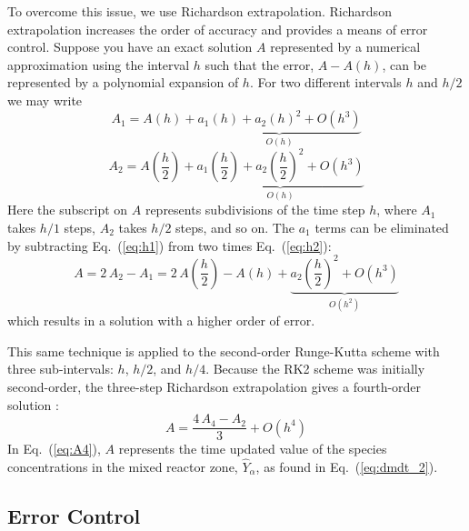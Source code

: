 To overcome this issue, we use Richardson extrapolation. Richardson extrapolation increases the order of accuracy and provides a means of error control. Suppose you have an exact solution $A$ represented by a numerical approximation using the interval $h$ such that the error, $A-A(h)$, can be represented by a polynomial expansion of $h$. For
two different intervals $h$ and $h/2$ we may write
\begin{equation}\label{eq:h1}
A_1={A(h)} + \underbrace{a_{1}(h) + a_{2}(h)^2 + \mathit{O}(h^3)}_{\mathit{O}(h)}
\end{equation}
\begin{equation}\label{eq:h2}
A_2=A\left(\frac{h}{2}\right) + \underbrace{a_{1}\left(\frac{h}{2}\right) + a_{2}\left(\frac{h}{2}\right)^2 + \mathit{O}(h^3)}_{\mathit{O}(h)}
\end{equation}
Here the subscript on $A$ represents subdivisions of the time step $h$, where $A_1$ takes $h/1$ steps, $A_2$ takes $h/2$ steps, and so on. The $a_{1}$ terms can be eliminated by subtracting Eq.~(\ref{eq:h1}) from two times Eq.~(\ref{eq:h2}):
\begin{equation}\label{eq:A2}
A=2\,A_2-A_1 = 2\,A\left(\frac{h}{2}\right) - A(h) + \underbrace{a_{2}\left(\frac{h}{2}\right)^2 + \mathit{O}(h^3)}_{\mathit{O}(h^2)}
\end{equation}
which results in a solution with a higher order of error.

This same technique is applied to the second-order Runge-Kutta scheme with three sub-intervals: $h$, $h/2$, and $h/4$. Because the RK2 scheme was initially second-order, the three-step Richardson extrapolation gives a fourth-order solution \cite{Moin:2001}:
\begin{equation}\label{eq:A4}
A=\frac{4\,A_4-A_2}{3}  + \mathit{O}(h^4)
\end{equation}
In Eq.~(\ref{eq:A4}), $A$ represents the time updated value of the species concentrations in the mixed reactor zone, $\hat{Y}_{\alpha}$, as found in Eq.~(\ref{eq:dmdt_2}).

\subsection*{Error Control}

